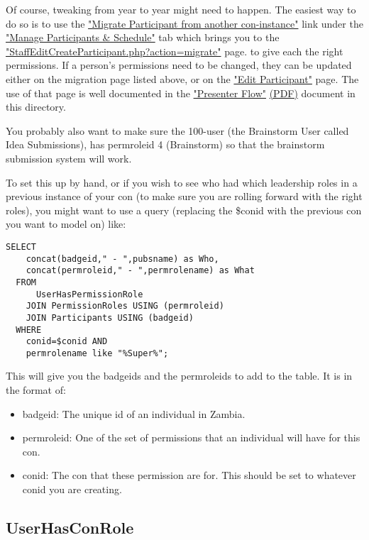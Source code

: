 \documentclass[captions=tablesignature]{scrartcl}
\begin{document}
Of course, tweaking from year to year might need to happen.  The
easiest way to do so is to use the 
\href{../webpages/StaffEditCreateParticipant.php?action=migrate}{"Migrate Participant from another con-instance"} link under the
\href{../webpages/StaffManageParticipants.php}{"Manage Participants \& Schedule"} tab which brings you to the
\href{../webpages/StaffEditCreateParticipant.php?action=migrate}{"StaffEditCreateParticipant.php?action=migrate"} page.
to give each the right permissions. If a person's permissions need
to be changed, they can be updated either on the migration page
listed above, or on the \href{../webpages/StaffEditCreateParticipant.php?action=edit}{"Edit Participant"} page. The use of that
page is well documented in the \href{./Presenter_Flow.html}{"Presenter Flow"} \href{./Presenter_Flow.pdf}{(PDF)} document in
this directory.

You probably also want to make sure the 100-user (the Brainstorm
User called Idea Submissions), has permroleid 4 (Brainstorm) so
that the brainstorm submission system will work.

To set this up by hand, or if you wish to see who had which
leadership roles in a previous instance of your con (to make sure
you are rolling forward with the right roles), you might want to
use a query (replacing the \$conid with the previous con you want to
model on) like:
\begin{verbatim}
SELECT
    concat(badgeid," - ",pubsname) as Who,
    concat(permroleid," - ",permrolename) as What
  FROM
      UserHasPermissionRole
    JOIN PermissionRoles USING (permroleid)
    JOIN Participants USING (badgeid)
  WHERE
    conid=$conid AND
    permrolename like "%Super%";
\end{verbatim}
This will give you the badgeids and the permroleids to add to the
table.  It is in the format of:
\begin{itemize}
\item badgeid: The unique id of an individual in Zambia.
\item permroleid: One of the set of permissions that an individual will
have for this con.
\item conid: The con that these permission are for.  This should be set
to whatever conid you are creating.
\end{itemize}

\subsection{UserHasConRole}
\label{sec-12-2}
\end{document}
